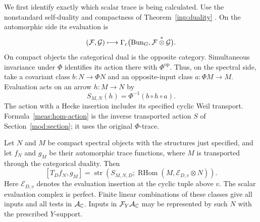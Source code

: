 We first identify exactly which scalar trace is being calculated.  Use the
nonstandard self-duality and compactness of Theorem~\ref{inp:duality}
\cite[Theorem~3.2.2 and Appendix~A.1]{AGKRRV2}.
On the automorphic side its evaluation is
\[
 (\mathcal F,\mathcal G)\longmapsto
 \Gamma_c\bigl(\operatorname{Bun}_G,\mathcal F\mathbin{\overset{*}{\otimes}}
                         \mathcal G\bigr).
\]
On compact objects the categorical dual is the opposite category.
Simultaneous invariance under $\Phi$ identifies its action there with
$\Phi^{\mathrm{op}}$.  Thus, on the spectral side, take a covariant class
$b:N\longrightarrow\Phi N$ and an opposite-input class
$a:\Phi M\longrightarrow M$.  Evaluation acts on an arrow $h:M\to N$ by
\begin{equation}\label{meas:hom-action}
 S_{M,N}(h)=\Phi^{-1}(b\circ h\circ a).
\end{equation}
The action with a Hecke insertion includes its specified cyclic Weil
transport.  Formula~\eqref{meas:hom-action} is the inverse transported action
$S$ of Section~\ref{mod:section}; it uses the original $\Phi$-trace.

\begin{lemma}\label{meas:hom-functions}
Let $N$ and $M$ be compact spectral objects with the structures just
specified, and let $f_N$ and $g_M$ be their automorphic trace functions,
where $M$ is transported through the categorical duality.  Then
\begin{equation}\label{meas:hom-function-formula}
 [T_Df_N,g_M]
 =\operatorname{str}\!\left(
 S_{M,N,D};\operatorname{RHom}(M,\mathcal E_{D,v}\otimes N)\right).
\end{equation}
Here $\mathcal E_{D,v}$ denotes the evaluation insertion at the cyclic tuple
above $v$.  The scalar evaluation complex is perfect.  Finite linear
combinations of these classes give all inputs and all tests in
$\mathcal A_{\mathbb C}$.  Inputs in $\mathcal F_Y\mathcal A_{\mathbb C}$ may be represented by such $N$ with
the prescribed $Y$-support.
\end{lemma}

